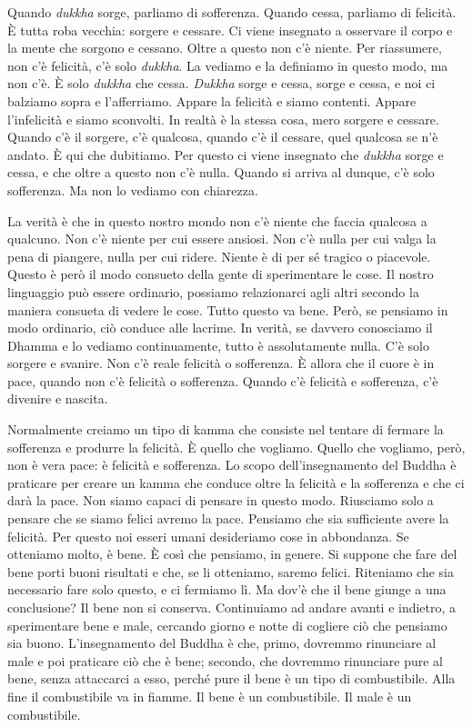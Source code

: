 Quando \emph{dukkha} sorge, parliamo di sofferenza. Quando cessa,
parliamo di felicità. È tutta roba vecchia: sorgere e cessare. Ci viene
insegnato a osservare il corpo e la mente che sorgono e cessano. Oltre a
questo non c'è niente. Per riassumere, non c'è felicità, c'è solo
\emph{dukkha}. La vediamo e la definiamo in questo modo, ma non c'è. È
solo \emph{dukkha} che cessa. \emph{Dukkha} sorge e cessa, sorge e
cessa, e noi ci balziamo sopra e l'afferriamo. Appare la felicità e
siamo contenti. Appare l'infelicità e siamo sconvolti. In realtà è la
stessa cosa, mero sorgere e cessare. Quando c'è il sorgere, c'è
qualcosa, quando c'è il cessare, quel qualcosa se n'è andato. È qui che
dubitiamo. Per questo ci viene insegnato che \emph{dukkha} sorge e
cessa, e che oltre a questo non c'è nulla. Quando si arriva al dunque,
c'è solo sofferenza. Ma non lo vediamo con chiarezza.

La verità è che in questo nostro mondo non c'è niente che faccia
qualcosa a qualcuno. Non c'è niente per cui essere ansiosi. Non c'è
nulla per cui valga la pena di piangere, nulla per cui ridere. Niente è
di per sé tragico o piacevole. Questo è però il modo consueto della
gente di sperimentare le cose. Il nostro linguaggio può essere
ordinario, possiamo relazionarci agli altri secondo la maniera consueta
di vedere le cose. Tutto questo va bene. Però, se pensiamo in modo
ordinario, ciò conduce alle lacrime. In verità, se davvero conosciamo il
Dhamma e lo vediamo continuamente, tutto è assolutamente nulla. C'è solo
sorgere e svanire. Non c'è reale felicità o sofferenza. È allora che il
cuore è in pace, quando non c'è felicità o sofferenza. Quando c'è
felicità e sofferenza, c'è divenire e nascita.

Normalmente creiamo un tipo di kamma che consiste nel tentare di
fermare la sofferenza e produrre la felicità. È quello che vogliamo.
Quello che vogliamo, però, non è vera pace: è felicità e sofferenza. Lo
scopo dell'insegnamento del Buddha è praticare per creare un
kamma che conduce oltre la felicità e la sofferenza e che ci darà
la pace. Non siamo capaci di pensare in questo modo. Riusciamo solo a
pensare che se siamo felici avremo la pace. Pensiamo che sia sufficiente
avere la felicità. Per questo noi esseri umani desideriamo cose in
abbondanza. Se otteniamo molto, è bene. È così che pensiamo, in genere.
Si suppone che fare del bene porti buoni risultati e che, se li
otteniamo, saremo felici. Riteniamo che sia necessario fare solo questo,
e ci fermiamo lì. Ma dov'è che il bene giunge a una conclusione? Il bene
non si conserva. Continuiamo ad andare avanti e indietro, a sperimentare
bene e male, cercando giorno e notte di cogliere ciò che pensiamo sia
buono. L'insegnamento del Buddha è che, primo, dovremmo rinunciare al
male e poi praticare ciò che è bene; secondo, che dovremmo rinunciare
pure al bene, senza attaccarci a esso, perché pure il bene è un tipo di
combustibile. Alla fine il combustibile va in fiamme. Il bene è un
combustibile. Il male è un combustibile.

